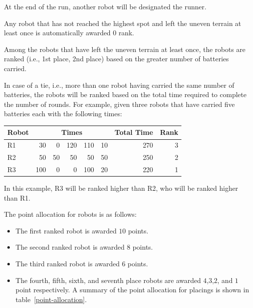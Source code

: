 \documentclass[12pt]{hurocup}
\begin{document}
\begin{lawlist}[LC]
\item At the end of the run, another robot will be designated the
  runner.

\end{lawlist}


\begin{lawlist}[LC]
\item Any robot that has not reached the highest spot and left the
  uneven terrain at least once is automatically awarded $0$ rank.

\item Among the robots that have left the uneven terrain at least
  once, the robots are ranked (i.e., 1st place, 2nd place) based on
  the greater number of batteries carried.

\item In case of a tie, i.e., more than one robot having carried the
  same number of batteries, the robots will be ranked based on the
  total time required to complete the number of rounds. For example,
  given three robots that have carried five batteries each with the
  following times:

      \begin{center}
        \begin{tabular}{l|rrrrr|r|r|}
          \hline
          Robot & \multicolumn{5}{c}{Times} & Total Time & Rank \\
          \hline
          R1 & 30 & 0 & 120 & 110 & 10 & 270 & 3 \\
          R2 & 50 & 50 & 50 & 50 & 50 & 250 & 2 \\
          R3 & 100 & 0 & 0 & 100 & 20 & 220 & 1 \\
          \hline
        \end{tabular}
      \end{center}

  In this example, R3 will be ranked higher than R2, who will be
  ranked higher than R1.

\item The point allocation for robots is as follows:
  \begin{itemize}
  \item The first ranked robot is awarded $10$ points.
  \item The second ranked robot is awarded $8$ points.
  \item The third ranked robot is awarded $6$ points.
  \item The fourth, fifth, sixth, and seventh place robots are awarded
    $4$,$3$,$2$, and $1$ point respectively.  A summary of the point
    allocation for placings is shown in table~\ref{point-allocation}.


\end{itemize}
\end{lawlist}
\end{document}
